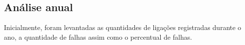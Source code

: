 \subsection{Análise anual}
Inicialmente, foram levantadas as quantidades de ligações registradas durante o ano, a quantidade de falhas assim como o percentual de falhas.